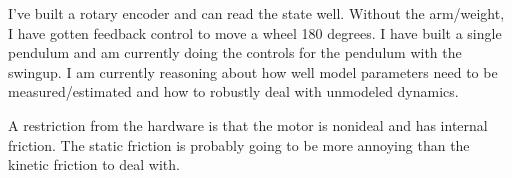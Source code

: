 \documentclass{article}
\begin{document}
I've built a rotary encoder and can read the state well. Without the arm/weight, I have gotten feedback control to move a wheel 180 degrees. I have built a single pendulum and am currently doing the controls for the pendulum with the swingup. I am currently reasoning about how well model parameters need to be measured/estimated and how to robustly deal with unmodeled dynamics.

A restriction from the hardware is that the motor is nonideal and has internal friction. The static friction is probably going to be more annoying than the kinetic friction to deal with.
\end{document}
